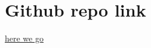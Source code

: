 \documentclass[11pt,a4paper]{article}
\begin{document}


\section{Github repo link}
\href{https://github.com/sabilxD/pa-1-MESI}{here we go}
\end{document}

